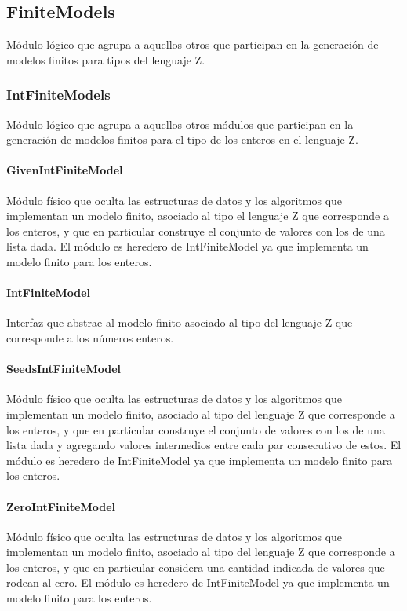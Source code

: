 \documentclass[a4paper,10pt]{report}
\begin{document}
		\subsection{FiniteModels}
		Módulo lógico que agrupa a aquellos otros que participan en la generación de modelos finitos para tipos del lenguaje Z.
			\subsubsection{IntFiniteModels}
			Módulo lógico que agrupa a aquellos otros módulos que participan en la generación de modelos finitos para el tipo de los enteros en el lenguaje Z.
				\paragraph{GivenIntFiniteModel}
				Módulo físico que oculta las estructuras de datos y los algoritmos que implementan un modelo finito, asociado al tipo el lenguaje Z que corresponde a los enteros, y que en particular construye el conjunto de valores con los de una lista dada. El módulo es heredero de IntFiniteModel ya que implementa un modelo finito para los enteros.
				\paragraph{IntFiniteModel}
				Interfaz que abstrae al modelo finito asociado al tipo del lenguaje Z que corresponde a los números enteros. 
				\paragraph{SeedsIntFiniteModel}
				Módulo físico que oculta las estructuras de datos y los algoritmos que implementan un modelo finito, asociado al tipo del lenguaje Z que corresponde a los enteros, y que en particular construye el conjunto de valores con los de una lista dada y agregando valores intermedios entre cada par consecutivo de estos. El módulo es heredero de IntFiniteModel ya que implementa un modelo finito para los enteros.
				\paragraph{ZeroIntFiniteModel}
				Módulo físico que oculta las estructuras de datos y los algoritmos que implementan un modelo finito, asociado al tipo del lenguaje Z que corresponde a los enteros, y que en particular considera una cantidad indicada de valores que rodean al cero. El módulo es heredero de IntFiniteModel ya que implementa un modelo finito para los enteros.
\end{document}
